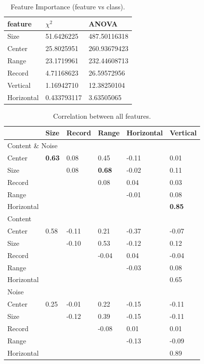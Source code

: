 \begin{table}[h]
\centering
\caption{Feature Importance (feature vs class).}
\label{tab:importance}
\begin{tabular}{| l | l | l |}
\hline
feature & $\chi^2$ & ANOVA \\
\hline
Size       & 51.6426225  & 487.50116318 \\
Center     & 25.8025951  & 260.93679423 \\
Range      & 23.1719961  & 232.44608713 \\
Record     & 4.71168623  & 26.59572956 \\
Vertical   & 1.16942710  & 12.38250104 \\
Horizontal & 0.433793117 & 3.63505065 \\
\hline
\end{tabular}
\end{table}
         
\begin{table}[h]
\centering
\caption{Correlation between all features.}
\label{tab:featcorr}
\begin{tabular}{ | l | l | l | l | l | l |}
\hline
& Size & Record & Range & Horizontal & Vertical \\ \hline
\multicolumn{6}{|l|}{Content \& Noise} \\
\hline
Center & \textbf{0.63} & 0.08 & 0.45 & -0.11 & 0.01 \\
Size & & 0.08 & \textbf{0.68} & -0.02 & 0.11 \\
Record & & & 0.08 & 0.04 & 0.03 \\
Range & & & & -0.01 & 0.08 \\
Horizontal & & & & & \textbf{0.85} \\
\hline
\multicolumn{6}{|l|}{Content} \\
\hline
Center & 0.58 & -0.11 & 0.21 & -0.37 & -0.07 \\
Size & & -0.10 & 0.53 & -0.12 & 0.12 \\
Record & & & -0.04 & 0.04 & -0.04 \\
Range & & & & -0.03 & 0.08 \\
Horizontal & & & & & 0.65 \\
\hline
\multicolumn{6}{|l|}{Noise} \\
\hline
Center & 0.25 & -0.01 & 0.22 & -0.15 & -0.11 \\
Size & & -0.12 & 0.39 & -0.15 & -0.11 \\
Record & & & -0.08 & 0.01 & 0.01 \\
Range & & & & -0.13 & -0.09 \\
Horizontal & & & & & 0.89 \\
\hline
\end{tabular}
\end{table}

